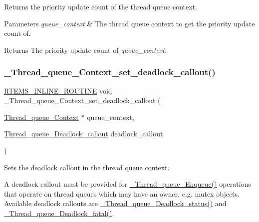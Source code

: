 Returns the priority update count of the thread queue context. 


\begin{DoxyParams}{Parameters}
{\em queue\+\_\+context} & The thread queue context to get the priority update count of.\\
\hline
\end{DoxyParams}
\begin{DoxyReturn}{Returns}
The priority update count of {\itshape queue\+\_\+context}. 
\end{DoxyReturn}
\mbox{\label{group__RTEMSScoreThreadQueue_gab024e7369bc091e53e7bb04ed8ebfb61}} 
\subsubsection{\texorpdfstring{\_Thread\_queue\_Context\_set\_deadlock\_callout()}{\_Thread\_queue\_Context\_set\_deadlock\_callout()}}
{\footnotesize\ttfamily \mbox{\hyperlink{group__RTEMSScoreBaseDefs_gac216239df231d5dbd15e3520b0b9313f}{R\+T\+E\+M\+S\+\_\+\+I\+N\+L\+I\+N\+E\+\_\+\+R\+O\+U\+T\+I\+NE}} void \+\_\+\+Thread\+\_\+queue\+\_\+\+Context\+\_\+set\+\_\+deadlock\+\_\+callout (\begin{DoxyParamCaption}\item[{\mbox{\hyperlink{structThread__queue__Context}{Thread\+\_\+queue\+\_\+\+Context}} $\ast$}]{queue\+\_\+context,  }\item[{\mbox{\hyperlink{group__RTEMSScoreThreadQueue_gab2878c08655ad0911fe6540a1adaf3a3}{Thread\+\_\+queue\+\_\+\+Deadlock\+\_\+callout}}}]{deadlock\+\_\+callout }\end{DoxyParamCaption})}



Sets the deadlock callout in the thread queue context. 

A deadlock callout must be provided for \mbox{\hyperlink{group__RTEMSScoreThreadQueue_ga4992b40810f6d287c832bdad240dbc90}{\+\_\+\+Thread\+\_\+queue\+\_\+\+Enqueue()}} operations that operate on thread queues which may have an owner, e.\+g. mutex objects. Available deadlock callouts are \mbox{\hyperlink{group__RTEMSScoreThreadQueue_gaca11db0fbad98d6b0ee9a41139aa7d54}{\+\_\+\+Thread\+\_\+queue\+\_\+\+Deadlock\+\_\+status()}} and \mbox{\hyperlink{group__RTEMSScoreThreadQueue_ga673681292c0f047b02c6dbb6819e0ad7}{\+\_\+\+Thread\+\_\+queue\+\_\+\+Deadlock\+\_\+fatal()}}.


